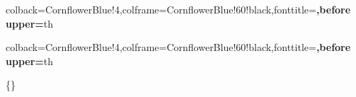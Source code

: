 
\usepackage{mathtools,physics,tensor}
\usepackage{bbold,mathrsfs}
\usepackage{bm}
\usepackage{slashed}
\usepackage[cdot, thickqspace, squaren]{SIunits}


%

\theoremstyle{plain}%
\newtheorem{thm}{Theorem}[section]
\newtheorem{lem}[thm]{Lemma}
\newtheorem{prop}[thm]{Proposition}
\newtheorem*{thm*}{Theorem}
\newtheorem*{lem*}{Lemma}
\newtheorem*{prop*}{Proposition}
\newtheorem*{cor}{Corollary}

\theoremstyle{definition}
\newtheorem{defn}{Definition}[section]
\newtheorem{es}{Example}[section]
\newtheorem{ex}{Exercise}[section]
\newtheorem*{defn*}{Definition}
\newtheorem*{es*}{Example}
\newtheorem*{ex*}{Exercise}
\newtheorem*{note}{Note}


%
{colback=CornflowerBlue!4,colframe=CornflowerBlue!60!black,fonttitle=\bfseries,before upper={\parindent15pt\noindent}}{th}

%
{colback=CornflowerBlue!4,colframe=CornflowerBlue!60!black,fonttitle=\bfseries,before upper={\parindent15pt\noindent}}{th}



\newcommand{\staple}{\scalebox{.8}[1.4]{$\sqsupset$}}

\DeclarePairedDelimiter\set\{\}

\newcommand{\partdev}[2]%
	{\frac{\partial {#1}}{\partial {#2}}}

\newcommand{\partfix}[3]%
	{\left(\partdev{#1}{#2}\right)_{#3}}
	
\newcommand{\qqimplies}{\qquad\implies\qquad}

\newcommand{\hplanck}{(2\pi \hbar)}

\newcommand{\kt}{k_B T}
